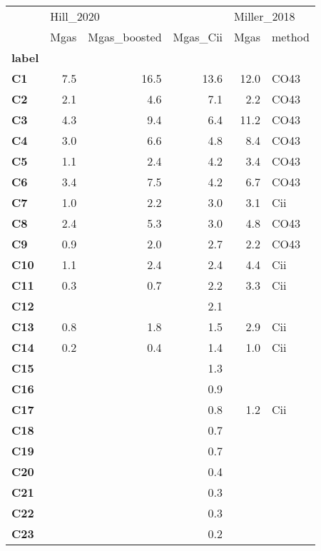 \begin{tabular}{lrrrrl}
\toprule
{} & \multicolumn{3}{l}{Hill\_2020} & \multicolumn{2}{l}{Miller\_2018} \\
{} &      Mgas & Mgas\_boosted & Mgas\_Cii &        Mgas & method \\
\textbf{label} &           &              &          &             &        \\
\midrule
\textbf{C1   } &       7.5 &         16.5 &     13.6 &        12.0 &   CO43 \\
\textbf{C2   } &       2.1 &          4.6 &      7.1 &         2.2 &   CO43 \\
\textbf{C3   } &       4.3 &          9.4 &      6.4 &        11.2 &   CO43 \\
\textbf{C4   } &       3.0 &          6.6 &      4.8 &         8.4 &   CO43 \\
\textbf{C5   } &       1.1 &          2.4 &      4.2 &         3.4 &   CO43 \\
\textbf{C6   } &       3.4 &          7.5 &      4.2 &         6.7 &   CO43 \\
\textbf{C7   } &       1.0 &          2.2 &      3.0 &         3.1 &    Cii \\
\textbf{C8   } &       2.4 &          5.3 &      3.0 &         4.8 &   CO43 \\
\textbf{C9   } &       0.9 &          2.0 &      2.7 &         2.2 &   CO43 \\
\textbf{C10  } &       1.1 &          2.4 &      2.4 &         4.4 &    Cii \\
\textbf{C11  } &       0.3 &          0.7 &      2.2 &         3.3 &    Cii \\
\textbf{C12  } &           &              &      2.1 &             &        \\
\textbf{C13  } &       0.8 &          1.8 &      1.5 &         2.9 &    Cii \\
\textbf{C14  } &       0.2 &          0.4 &      1.4 &         1.0 &    Cii \\
\textbf{C15  } &           &              &      1.3 &             &        \\
\textbf{C16  } &           &              &      0.9 &             &        \\
\textbf{C17  } &           &              &      0.8 &         1.2 &    Cii \\
\textbf{C18  } &           &              &      0.7 &             &        \\
\textbf{C19  } &           &              &      0.7 &             &        \\
\textbf{C20  } &           &              &      0.4 &             &        \\
\textbf{C21  } &           &              &      0.3 &             &        \\
\textbf{C22  } &           &              &      0.3 &             &        \\
\textbf{C23  } &           &              &      0.2 &             &        \\
\bottomrule
\end{tabular}
